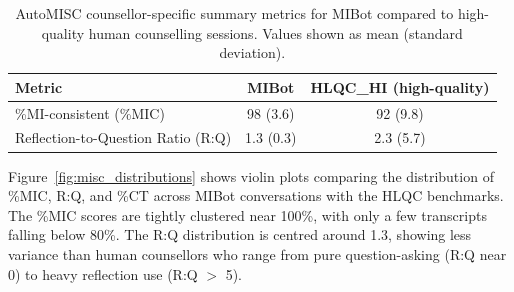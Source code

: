 \begin{table}[ht]
  \centering
  \small
  \setlength{\tabcolsep}{4pt}
  \renewcommand{\arraystretch}{1.1}
  \begin{tabular}{@{}lcc@{}}
    \toprule
    \textbf{Metric} & \textbf{MIBot} & \textbf{HLQC\_HI (high-quality)} \\
    \midrule
    \%MI-consistent (\%MIC) & 98 (3.6) & 92 (9.8) \\
    Reflection-to-Question Ratio (R:Q) & 1.3 (0.3) & 2.3 (5.7) \\
    \bottomrule
  \end{tabular}
  \caption{AutoMISC counsellor-specific summary metrics for MIBot compared to high-quality human counselling sessions. Values shown as mean (standard deviation).}
  \label{table:automisc_summary}
\end{table}

Figure~\ref{fig:misc_distributions} shows violin plots comparing the distribution of \%MIC, R:Q, and \%CT across MIBot conversations with the HLQC benchmarks. The \%MIC scores are tightly clustered near 100\%, with only a few transcripts falling below 80\%. The R:Q distribution is centred around 1.3, showing less variance than human counsellors who range from pure question-asking (R:Q near 0) to heavy reflection use (R:Q $>$ 5).

